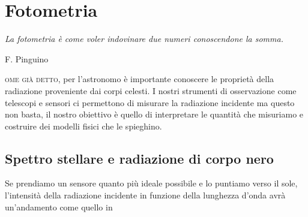 \chapter{Fotometria}\label{ch:fotometria}
\epigraph{\itshape La fotometria è come voler indovinare due numeri conoscendone la somma.}{F. Pinguino}
\noindent{}\textsc{ome già detto}, per l'astronomo è importante conoscere le proprietà della radiazione proveniente dai corpi celesti. I nostri strumenti di osservazione come telescopi e sensori ci permettono di misurare la radiazione incidente ma questo non basta, il nostro obiettivo è quello di interpretare le quantità che misuriamo e costruire dei modelli fisici che le spieghino.
\section{Spettro stellare e radiazione di corpo nero}
    Se prendiamo un sensore quanto più ideale possibile e lo puntiamo verso il sole, l'intensità della radiazione incidente in funzione della lunghezza d'onda avrà un'andamento come quello in
